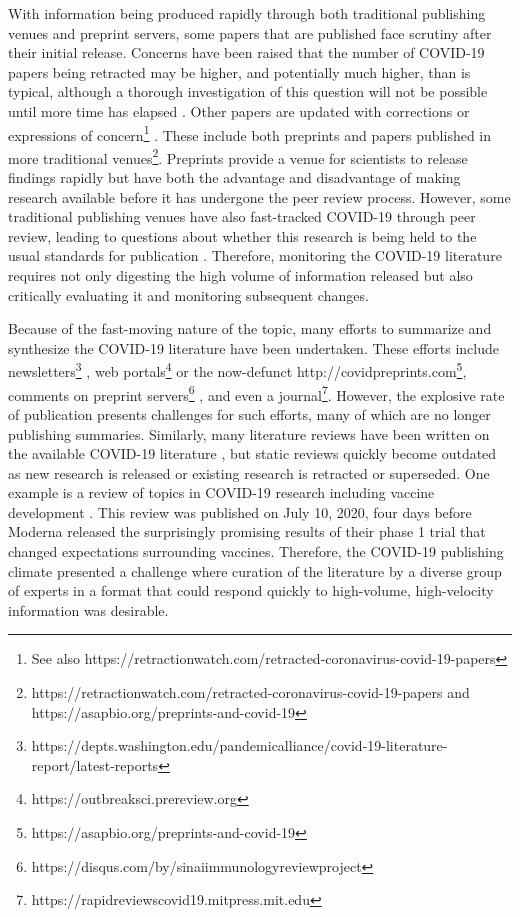 \documentclass[twocolumn]{ceurart}
\begin{document}
With information being produced rapidly through both traditional publishing venues and preprint servers, some papers that are published face scrutiny after their initial release.
Concerns have been raised that the number of COVID-19 papers being retracted may be higher, and potentially much higher, than is typical, although a thorough investigation of this question will not be possible until more time has elapsed \citep{ZUk10707, caxpZEmy}.
Other papers are updated with corrections or expressions of concern\footnote{See also https://retractionwatch.com/retracted-coronavirus-covid-19-papers} \citep{caxpZEmy}.
These include both preprints and papers published in more traditional venues\footnote{https://retractionwatch.com/retracted-coronavirus-covid-19-papers and https://asapbio.org/preprints-and-covid-19}.
Preprints provide a venue for scientists to release findings rapidly but have both the advantage and disadvantage of making research available before it has undergone the peer review process.
However, some traditional publishing venues have also fast-tracked COVID-19 through peer review, leading to questions about whether this research is being held to the usual standards for publication \citep{1Dez1ZOc5}.
Therefore, monitoring the COVID-19 literature requires not only digesting the high volume of information released but also critically evaluating it and monitoring subsequent changes.

Because of the fast-moving nature of the topic, many efforts to summarize and synthesize the COVID-19 literature have been undertaken.
These efforts include newsletters\footnote{https://depts.washington.edu/pandemicalliance/covid-19-literature-report/latest-reports} \citep{JdWiPJCL}, web portals\footnote{https://outbreaksci.prereview.org} \citep{1CBWvhTdy} or the now-defunct http://covidpreprints.com\footnote{https://asapbio.org/preprints-and-covid-19}, comments on preprint servers\footnote{https://disqus.com/by/sinaiimmunologyreviewproject} \citep{YZ4cHNuH}, and even a journal\footnote{https://rapidreviewscovid19.mitpress.mit.edu}.
However, the explosive rate of publication presents challenges for such efforts, many of which are no longer publishing summaries.
Similarly, many literature reviews have been written on the available COVID-19 literature \citep{I2EsJmfs, 5x25saIz, evtsR3C5, 18eCxyLhx, SAE5ME3N, xOs5ctsW}, but static reviews quickly become outdated as new research is released or existing research is retracted or superseded.
One example is a review of topics in COVID-19 research including vaccine development \citep{xOs5ctsW}.
This review was published on July 10, 2020, four days before Moderna released the surprisingly promising results of their phase 1 trial \citep{wiGjCZC8} that changed expectations surrounding vaccines.
Therefore, the COVID-19 publishing climate presented a challenge where curation of the literature by a diverse group of experts in a format that could respond quickly to high-volume, high-velocity information was desirable.
\end{document}
